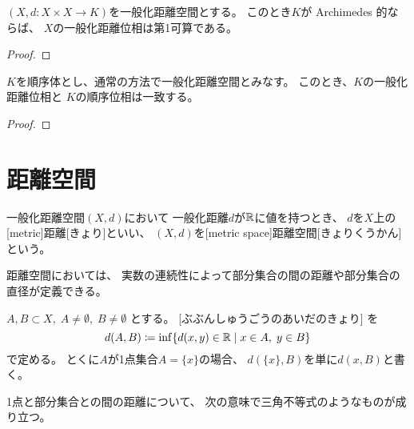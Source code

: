 \documentclass[report]{jlreq}
\begin{document}
\begin{proposition}
    $(X, d \colon X \times X \to K)$を一般化距離空間とする。
    このとき$K$が Archimedes 的ならば、
    $X$の一般化距離位相は第1可算である。
\end{proposition}

\begin{proof}
    \TODO{}
\end{proof}

\begin{proposition}
    $K$を順序体とし、通常の方法で一般化距離空間とみなす。
    このとき、$K$の一般化距離位相と
    $K$の順序位相は一致する。
\end{proposition}

\begin{proof}
    \TODO{}
\end{proof}

%
\section{距離空間}

\begin{definition}[距離空間]
    一般化距離空間$(X, d)$において
    一般化距離$d$が$\mathbb{R}$に値を持つとき、
    $d$を$X$上の[metric]{距離}[きょり]といい、
    $(X, d)$を[metric space]{距離空間}[きょりくうかん]という。
\end{definition}

距離空間においては、
実数の連続性によって部分集合の間の距離や部分集合の直径が定義できる。

\begin{definition}[部分集合の間の距離]
    $A, B \subset X, \; A \neq \emptyset, \; B \neq \emptyset$
    とする。
    [ぶぶんしゅうごうのあいだのきょり]
    を
    \begin{equation}
        d(A, B)
            \coloneqq \inf \{
                d(x, y) \in \mathbb{R}
                \mid
                x \in A, \; y \in B
            \}
    \end{equation}
    で定める。
    とくに$A$が1点集合$A = \{ x \}$の場合、
    $d(\{ x \}, B)$を単に$d(x, B)$と書く。
\end{definition}

1点と部分集合との間の距離について、
次の意味で三角不等式のようなものが成り立つ。
\end{document}
